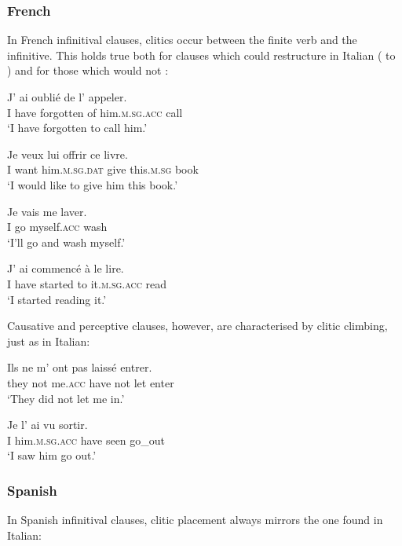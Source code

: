 \documentclass[output=paper,modfonts,nonflat,newtxmath]{langsci/langscibook}
\begin{document}
\subsubsection{French} %

In French infinitival clauses, clitics occur between the finite verb and the infinitive. This holds true both for clauses which could restructure in Italian ( to ) and for those which would not :

\ea \label{ex:sciutti:16}
    \gll J’ ai oublié de l’ appeler.\\
         I have forgotten of him.\textsc{m.sg.acc} call \\
    \glt  ‘I have forgotten to call him.’
\z

\ea \label{ex:sciutti:17}
    \gll Je veux lui offrir ce livre.\\
         I want him.\textsc{m.sg.dat} give   this.\textsc{m.sg} book \\
    \glt  ‘I would like to give him this book.’
\z

\ea \label{ex:sciutti:18}
    \gll Je vais me laver.\\
         I go myself.\textsc{acc} wash\\
    \glt  ‘I’ll go and wash myself.’
\z

\ea \label{ex:sciutti:19}
    \gll J’ ai commencé à le lire.\\
         I have started to it.\textsc{m.sg.acc}    read\\
    \glt  ‘I started reading it.’
\z

Causative and perceptive clauses, however, are characterised by clitic climbing, just as in Italian:

\ea \label{ex:sciutti:20}
    \gll Ils ne m’ ont pas laissé entrer.\\
         they not me.\textsc{acc} have not let enter \\
    \glt  ‘They did not let me in.’
\z

\ea \label{ex:sciutti:21}
    \gll Je l’ ai vu sortir.\\
         I him.\textsc{m.sg.acc} have seen go\_out \\
    \glt  ‘I saw him go out.’
\z

\subsubsection{Spanish} %

In Spanish infinitival clauses, clitic placement always mirrors the one found in Italian:%
\end{document}
